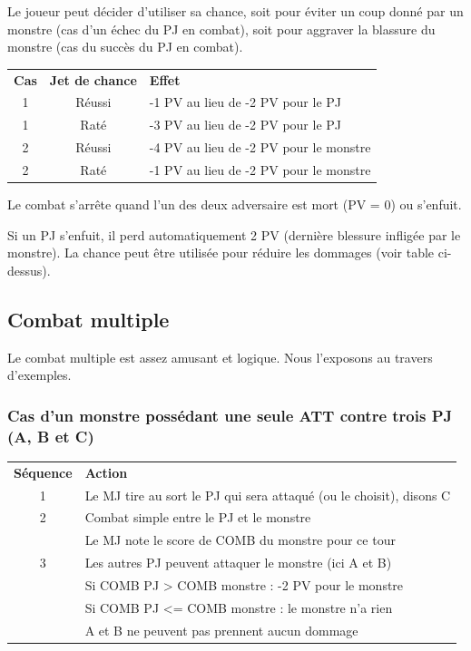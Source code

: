 \documentclass[a4paper, 11pt, twoside]{article}
\begin{document}
Le joueur peut décider d'utiliser sa chance, soit pour éviter un coup donné par un monstre (cas d'un échec du PJ en combat), soit pour aggraver la blassure du monstre (cas du succès du PJ en combat).

\begin{longtable}{ccl}
\textbf{Cas} & \textbf{Jet de chance} & \textbf{Effet}\\
1 & Réussi & -1 PV au lieu de -2 PV pour le PJ\\
1 & Raté & -3 PV au lieu de -2 PV pour le PJ\\
2 & Réussi & -4 PV au lieu de -2 PV pour le monstre\\
2 & Raté & -1 PV au lieu de -2 PV pour le monstre\\
\end{longtable}

Le combat s'arrête quand l'un des deux adversaire est mort (PV = 0) ou s'enfuit.

Si un PJ s'enfuit, il perd automatiquement 2 PV (dernière blessure infligée par le monstre). La chance peut être utilisée pour réduire les dommages (voir table ci-dessus).

\subsection{Combat multiple}
\label{sec:orgca959fb}

Le combat multiple est assez amusant et logique. Nous l'exposons au travers d'exemples.

\subsubsection{Cas d'un monstre possédant une seule ATT contre trois PJ (A, B et C)}
\label{sec:orgef49132}

\begin{longtable}{cl}
\textbf{Séquence} & \textbf{Action}\\
1 & Le MJ tire au sort le PJ qui sera attaqué (ou le choisit), disons C\\
2 & Combat simple entre le PJ et le monstre\\
 & Le MJ note le score de COMB du monstre pour ce tour\\
3 & Les autres PJ peuvent attaquer le monstre (ici A et B)\\
 & Si COMB PJ > COMB monstre : -2 PV pour le monstre\\
 & Si COMB PJ <= COMB monstre : le monstre n'a rien\\
 & A et B ne peuvent pas prennent aucun dommage\\
\end{longtable}
\end{document}

